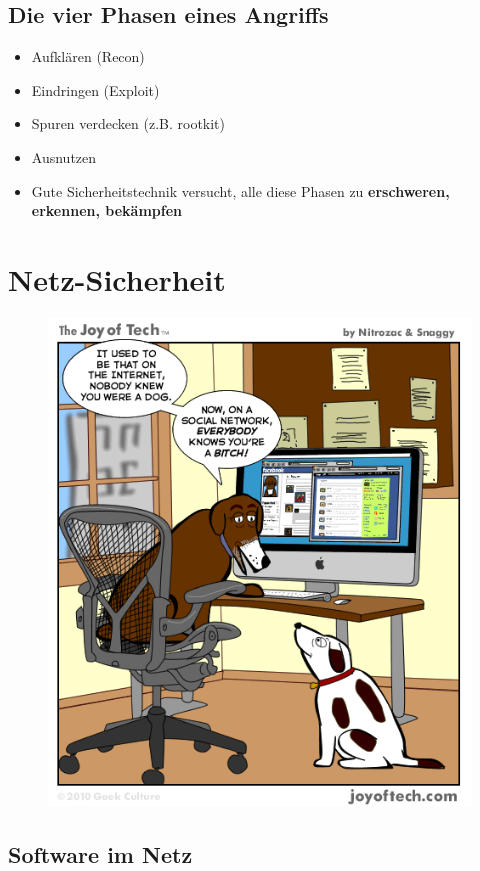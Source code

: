 \documentclass[openany]{book}
\begin{document}
\section{Die vier Phasen eines Angriffs}

\begin{itemize}
    \item Aufklären (Recon)
    \item Eindringen (Exploit)
    \item Spuren verdecken (z.B. rootkit)
    \item Ausnutzen \\
    \item Gute Sicherheitstechnik versucht, alle diese Phasen zu \textbf{erschweren, erkennen, bekämpfen}
\end{itemize}

\chapter{Netz-Sicherheit}

\begin{figure}[h!]
    \centering
    \includegraphics[width=0.85\linewidth]{Pics/meme.png}
\end{figure}

\section{Software im Netz}
\end{document}
